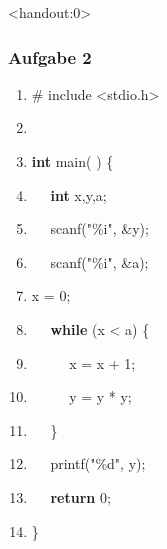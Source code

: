 \documentclass[aspectratio=1610,onlymath, ngerman]{beamer}
\renewcommand{\emph}[1]{\textbf{#1}}
\begin{document}
	\begin{frame}<handout:0> \frametitle{Aufgabe 2}
	\small
		\begin{minipage}{\dimexpr0.5\linewidth-\fboxrule-\fboxsep}
			\begin{ttfamily}
				\begin{enumerate}[label=\arabic* $\enskip$, nolistsep]
					\item \#\!\!\! include <stdio.h>
					\item 
					\item \emph{int} main( ) \{
					\item $\quad$ \emph{int} x,y,a;
					\item $\quad$ scanf("\%i", \&y);
					\item $\quad$ scanf("\%i", \&a);
					\item x = 0;
				\end{enumerate}
			\end{ttfamily}
		\end{minipage}
		\begin{minipage}{\dimexpr0.5\linewidth-\fboxrule-\fboxsep}
			\begin{ttfamily}
				\begin{enumerate}[label=\arabic* $\enskip$, nolistsep]
					\setcounter{enumi}{7}
					\item $\quad$ \emph{while} (x < a) \{
					\item $\quad$ $\quad$ x = x + 1;
					\item $\quad$ $\quad$ y = y * y;
					\item $\quad$ \}
					\item $\quad$ printf("\%d", y);
					\item $\quad$ \emph{return} 0;
					\item \}
				\end{enumerate}
			\end{ttfamily}
		\end{minipage}
	\end{frame}
	
\end{document}
